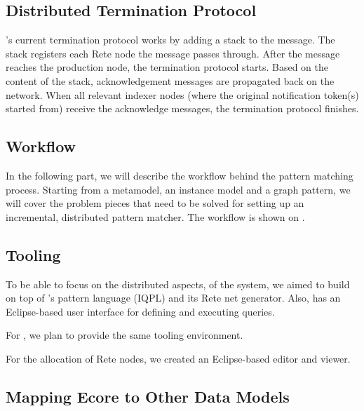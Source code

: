 
\subsection{Distributed Termination Protocol}

\iqd{}'s current termination protocol works by adding a stack to the message. The stack registers each Rete node the message passes through. After the message reaches the production node, the termination protocol starts. Based on the content of the stack, acknowledgement messages are propagated back on the network. When all relevant indexer nodes (where the original notification token(s) started from) receive the acknowledge messages, the termination protocol finishes.

\subsection{Workflow}
\label{workflow}

In the following part, we will describe the workflow behind the pattern matching process. Starting from a metamodel, an instance model and a graph pattern, we will cover the problem pieces that need to be solved for setting up an incremental, distributed pattern matcher. The workflow is shown on .
 

\subsection{Tooling}   

To be able to focus on the distributed aspects, of the system, we aimed to build \iqd{} on top of \eiq{}'s pattern language (IQPL) and its Rete net generator. Also, \eiq{} has an Eclipse-based user interface for defining and executing queries.

For \iqd{}, we plan to provide the same tooling environment.

For the allocation of Rete nodes, we created an Eclipse-based editor and viewer.

\subsection{Mapping Ecore to Other Data Models}
\label{ecore-mapping}

